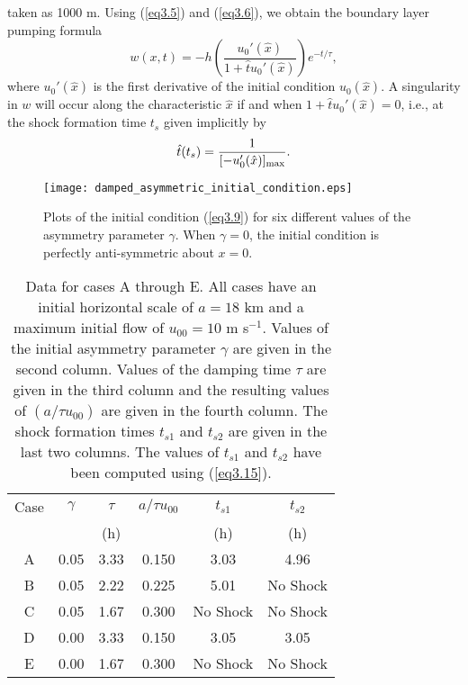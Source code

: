 \documentclass[10pt]{article}
\begin{document}
taken as 1000 m. Using (\ref{eq3.5}) and (\ref{eq3.6}), we obtain the
boundary layer pumping formula
\begin{equation}                                 %
    w(x,t) = -h\left(\frac{u_0'(\hat{x})}{1+\hat{t}u_0'(\hat{x})}\right)e^{-t/\tau},
\label{eq3.7}
\end{equation}
where $u_0'(\hat{x})$ is the first derivative of the initial condition $u_0(\hat{x})$.
A singularity in $w$ will occur along the characteristic $\hat{x}$ if
and when $1+\hat{t}u_0'(\hat{x})=0$, i.e., at the shock formation time
$t_s$ given implicitly by
\begin{equation}                                 %
     \hat{t}(t_s) = \frac{1}{[-u_0'(\hat{x})]_{\rm max}}.
\label{eq3.8}
\end{equation}



\begin{figure}[!t]                       %
\centerline{\texttt{[image: damped\_asymmetric\_initial\_condition.eps]}}
\caption{Plots of the initial condition (\ref{eq3.9}) for six different values
of the asymmetry parameter $\gamma$. When $\gamma=0$, the initial condition is
perfectly anti-symmetric about $x=0$.}
\end{figure}


\begin{table}[b!t]                        %
\centering
{\begin{tabular}{cccccc}
\hline\hline %
   Case  & $\gamma$ & $\tau$ & $a/\tau u_{00}$ &  $t_{s1}$  &  $t_{s2}$ \\
         &          & (h)    &                 &   (h)      &  (h)  \\
\hline %
    A    &   0.05   & 3.33   &      0.150      &    3.03    &   4.96    \\
    B    &   0.05   & 2.22   &      0.225      &    5.01    & No Shock  \\
    C    &   0.05   & 1.67   &      0.300      &  No Shock  & No Shock  \\
    D    &   0.00   & 3.33   &      0.150      &    3.05    &   3.05    \\
    E    &   0.00   & 1.67   &      0.300      &  No Shock  & No Shock  \\
\hline %
\end{tabular}}
\caption{Data for cases A through E. All cases have an initial horizontal scale of
$a=18$ km and a maximum initial flow of $u_{00}=10$ m s$^{-1}$.  Values of the
initial asymmetry parameter $\gamma$ are given in the second column. Values of the
damping time $\tau$ are given in the third column and the resulting values of
$(a/\tau u_{00})$ are given in the fourth column. The shock formation times
$t_{s1}$ and $t_{s2}$ are given in the last two columns. The values of $t_{s1}$
and $t_{s2}$ have been computed using (\ref{eq3.15}).}
\end{table}
\end{document}
